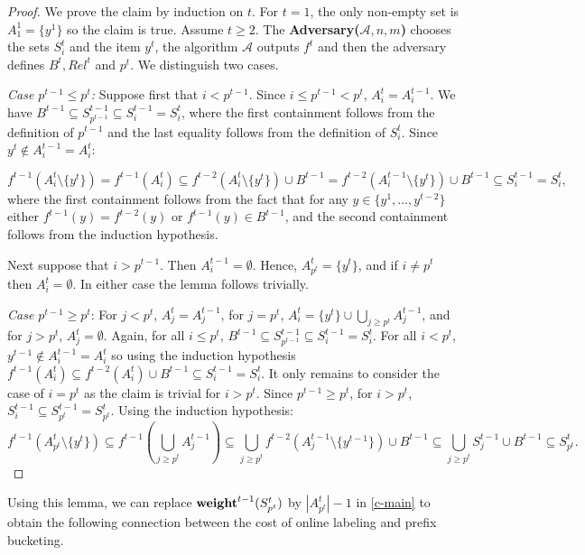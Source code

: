 \documentclass[unicode,review]{siamart1116}
\newcommand{\A}{\mathcal{A}}
\newcommand{\weight}{{\rm {\bf weight}}}
\numberwithin{theorem}{section}
\providecommand{\DIFadd}[1]{{\protect\color{blue}\uwave{#1}}} %
\providecommand{\DIFaddbegin}{} %
\providecommand{\DIFaddend}{} %
\newcommand{\DIFaddincludegraphics}[2][]{{\color{blue}\fbox{\DIFOincludegraphics[#1]{#2}}}} %
\DeclareRobustCommand{\DIFaddbegin}{\DIFOaddbegin \let\includegraphics\DIFaddincludegraphics} %
\DeclareRobustCommand{\DIFaddend}{\DIFOaddend \let\includegraphics\DIFOincludegraphics} %
\begin{document}
\begin{proof}  %
We prove the claim by induction on $t$. For $t=1$, the only non-empty set is $A^1_1=\{y^1\}$ so the claim is true.  Assume $t \geq 2$.
The {\bf Adversary($\A,n,m$)} chooses the sets $S^t_i$ and the item $y^t$,  the algorithm $\A$ outputs $f^t$ and then
the adversary defines $B^t, Rel^t$ and $p^t$.
We distinguish two cases.


\emph{Case $p^{t-1} \leq p^t$:} Suppose first that $i<p^{t-1}$.
Since $i\le p^{t-1}< p^{t}$, $A^{t}_i = A^{t-1}_i$. 
We have $B^{t-1} \subseteq S^{t-1}_{p^{t-1}} \subseteq S^{t-1}_i = S^t_i$, where
the first containment follows from the definition of $p^{t-1}$ and the last equality follows from the definition of $S^t_i$.
Since  $y^t \not\in A^{t-1}_i = A^t_i$:

$$f^{t-1}(A^t_i \setminus \{y^t\}) = f^{t-1}(A^t_i) \subseteq 
f^{t-2}(A^t_i \setminus \{y^t\}) \cup B^{t-1} = f^{t-2}(A^{t-1}_i\setminus \{y^t\}) \cup B^{t-1} \subseteq S^{t-1}_i = S^t_i,$$
where  the first containment follows from the fact that for any  $y \in
\{y^1,\ldots,y^{t-2}\}$ either $f^{t-1}(y)=f^{t-2}(y)$ or $f^{t-1}(y) \in B^{t-1}$, and the second containment follows from the induction hypothesis.

Next suppose that $i>p^{t-1}$.
Then $A^{t-1}_i=\emptyset$.  Hence, $A^t_{p^t}=\{y^t\}$, and
if $i\not=p^t$ then $A^t_i=\emptyset$.  In either case the lemma follows trivially.

\emph{Case $p^{t-1} \ge p^t$}: For $j < p^{t}$, $A^{t}_j = A^{t-1}_j$, for $j=p^t$, $A^t_i = \{y^t\} \cup \bigcup_{j\ge p^t} A^{t-1}_j$,
and for $j>p^t$, $A^t_j=\emptyset$. Again, for all $i\le p^{t}$, $B^{t-1} \subseteq S^{t-1}_{p^{t-1}} \subseteq S^{t-1}_i = S^t_i$.
For all $i<p^{t}$, $y^{t-1} \not\in A^{t-1}_i = A^t_i$ so using the induction hypothesis
$f^{t-1}(A^t_i) \subseteq f^{t-2}(A^t_i) \cup B^{t-1} \subseteq S^{t-1}_i = S^t_i$.
It only remains to consider the case of $i=p^t$ as the claim is trivial for $i>p^t$.
Since $p^{t-1} \ge p^t$, for $i>p^t$, $S^{t-1}_i \subseteq S^{t-1}_{p^t}=S^t_{p^t}$.
Using the induction hypothesis: 
$$f^{t-1}(A^t_{p^t} \setminus \{y^t\}) \subseteq f^{t-1}(\bigcup_{j\ge p^t} A^{t-1}_j)
\subseteq \bigcup_{j\ge p^t} f^{t-2}( A^{t-1}_j \setminus \{y^{t-1}\}) \cup B^{t-1} \subseteq 
\bigcup_{j \ge p^t} S^{t-1}_{j} \cup B^{t-1} \subseteq S^t_{p^t}.$$
\DIFaddbegin \hfill\DIFadd{${}$
}\DIFaddend \end{proof}


Using this lemma, we can replace $\weight^{t-1}(S^t_{p^t})$ by  $|A^t_{p^t}|-1$  in \cref{c-main} to 
obtain the following connection between
the cost of online labeling and prefix bucketing.
\end{document}
